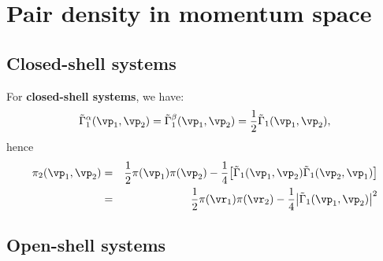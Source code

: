 \section{Pair density in momentum space}

\subsection{Closed-shell systems}

For \textbf{closed-shell systems}, we have:
%
\begin{equation}\label{eq:gamma1ab4css}
	\tilde\Gamma_1^{\alpha}(\vp_1,\vp_2)=\tilde\Gamma_1^{\beta}(\vp_1,\vp_2)=
	\frac{1}{2}\tilde\Gamma_1(\vp_1,\vp_2),
\end{equation}
%
hence
%
\begin{eqnarray}
	\pi_2(\vp_1,\vp_2) & = & \frac{1}{2}\pi(\vp_1)\pi(\vp_2)
	-\frac{1}{4}\big[\tilde\Gamma_1(\vp_1,\vp_2)\tilde\Gamma_1(\vp_2,\vp_1)\big]\\
	& = & \frac{1}{2}\pi(\vr_1)\pi(\vr_2)
	-\frac{1}{4}\big|\tilde\Gamma_1(\vp_1,\vp_2)\big|^2%
	\label{eq:rho2r1r2css}
\end{eqnarray}
%

\subsection{Open-shell systems}

